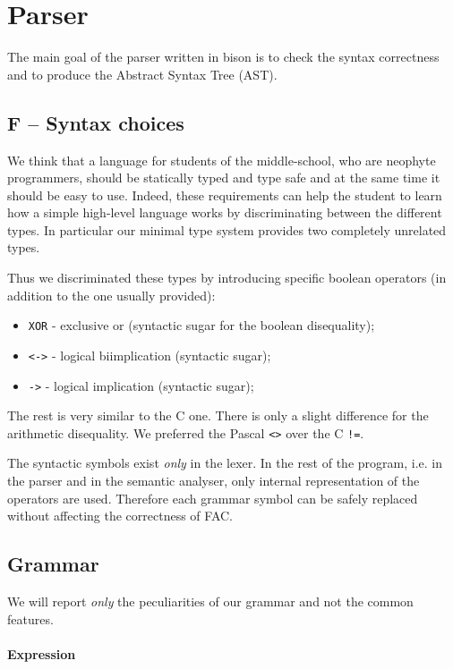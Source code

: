 \section{Parser}
\label{sec:parser}
The main goal of the parser written in bison is to check the
syntax correctness and to produce the Abstract Syntax Tree (AST).

\subsection{F -- Syntax choices}
We think that a language for students of the middle-school,
who are neophyte programmers, should be statically typed and type safe and
at the same time it should be easy to use. 
Indeed, these requirements can help the student to learn how a simple 
high-level language works by discriminating between the different types.
In particular our minimal type system provides two completely unrelated types.


Thus we discriminated these types by introducing specific boolean
operators (in addition to the one usually provided):
\begin{itemize}
	\item \verb|XOR| - exclusive or (syntactic sugar for the boolean disequality);
	\item \verb|<->| - logical biimplication (syntactic sugar);
	\item \verb|->| - logical implication (syntactic sugar);
\end{itemize}

The rest is very similar to the C one. There is only a slight difference
for the arithmetic disequality. We preferred the Pascal \verb|<>| over 
the C \verb|!=|.

The syntactic symbols exist \emph{only} in the lexer. In the
rest of the program, i.e. in the parser and in the semantic analyser, only
internal representation of the operators are used. Therefore each grammar
symbol can be safely replaced without affecting the correctness of FAC.

\subsection{Grammar}
We will report \emph{only} the peculiarities of our grammar and not the common 
features.

\paragraph{Expression}

